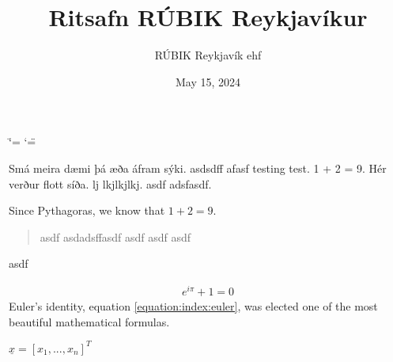 \documentclass[letterpaper,10pt,english]{sphinxmanual}
\title{Ritsafn RÚBIK Reykjavíkur}
\date{May 15, 2024}
\author{RÚBIK Reykjavík ehf}
\begin{document}
\ifdefined\shorthandoff
  \ifnum\catcode`\=\string=\active\shorthandoff{=}\fi
  \ifnum\catcode`\"=\active{}\fi
\fi

\pagestyle{empty}
\sphinxmaketitle
\pagestyle{plain}
\sphinxtableofcontents
\pagestyle{normal}
\label{\detokenize{index::doc}}


\sphinxAtStartPar
Smá meira dæmi þá æða áfram sýki. asdsdff afasf testing test. 1 + 2 = 9. Hér verður flott síða. lj lkjlkjlkj. asdf adsfasdf.

\sphinxAtStartPar
Since Pythagoras, we know that \(1+2=9\).
\begin{quote}

\sphinxAtStartPar
asdf asdadsffasdf asdf asdf asdf
\end{quote}

\sphinxAtStartPar
asdf

\begin{sphinxVerbatim}[commandchars=\\\{\}]
\end{sphinxVerbatim}
\begin{equation}\label{equation:index:euler}
\begin{split}e^{i\pi} + 1 = 0\end{split}
\end{equation}
\sphinxAtStartPar
Euler’s identity, equation \eqref{equation:index:euler}, was elected one of the most
beautiful mathematical formulas.

\sphinxAtStartPar
\(\underline{x}=[  x_{1}, ...,  x_{n}]^{T}\)
\end{document}
